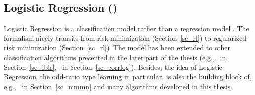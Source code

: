 {\fi




%
% 
\subsection{Logistic Regression (\lr)}\label{sc_lr}

Logistic Regression is a classification model rather than a regression model \citep{Bishop07}.
The formalism nicely transits from risk minimization (Section~\ref{sc_rl}) to regularized risk minimization (Section~\ref{sc_rl}).
The model has been extended to other classification algorithms presented in the later part of the thesis (e.g., \iblr\ in Section~\ref{sc_iblr}, \corrlog\ in Section~\ref{sc_corrlog}).
Besides, the idea of Logistic Regression, the odd-ratio type learning in particular, is also the building block of, e.g., \mmmn\ in Section~\ref{sc_mmmn} and many algorithms developed in this thesis.

}
